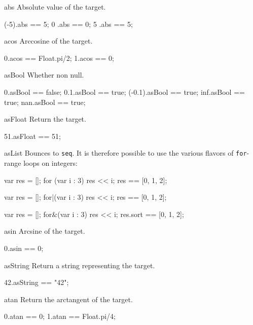\begin{urbiscriptapi}
\item[abs]
  Absolute value of the target.
\begin{urbiassert}
(-5).abs == 5;
  0 .abs == 0;
  5 .abs == 5;
\end{urbiassert}

\item[acos]
  Arccosine of the target.
\begin{urbiassert}
0.acos == Float.pi/2;
1.acos == 0;
\end{urbiassert}

\item[asBool]
  Whether non null.
\begin{urbiassert}
0.asBool == false;
0.1.asBool == true;
(-0.1).asBool == true;
inf.asBool == true;
nan.asBool == true;
\end{urbiassert}

\item[asFloat]
  Return the target.
\begin{urbiassert}
51.asFloat == 51;
\end{urbiassert}

\item[asList]
  Bounces to \lstinline|seq|.  It is therefore possible to use the
  various flavors of \lstinline|for|-range loops on integers:
\begin{urbiassert}
{
  var res = [];
  for (var i : 3)
    res << i;
  res
}
== [0, 1, 2];

{
  var res = [];
  for|(var i : 3)
    res << i;
  res
}
== [0, 1, 2];

{
  var res = [];
  for&(var i : 3)
    res << i;
  res.sort
}
== [0, 1, 2];
\end{urbiassert}%

\item[asin]
  Arcsine of the target.
\begin{urbiassert}
0.asin == 0;
\end{urbiassert}

\item[asString]
  Return a string representing the target.
\begin{urbiassert}
42.asString == "42";
\end{urbiassert}

\item[atan]
  Return the arctangent of the target.
\begin{urbiassert}
0.atan == 0;
1.atan == Float.pi/4;
\end{urbiassert}


\end{urbiscriptapi}
